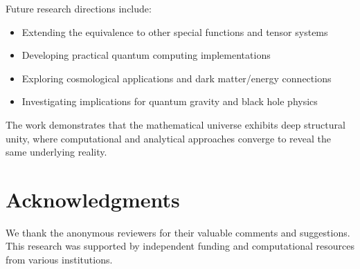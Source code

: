 \documentclass[12pt]{article}
\theoremstyle{plain}
\theoremstyle{definition}
\begin{document}
Future research directions include:
\begin{itemize}
\item Extending the equivalence to other special functions and tensor systems
\item Developing practical quantum computing implementations
\item Exploring cosmological applications and dark matter/energy connections
\item Investigating implications for quantum gravity and black hole physics
\end{itemize}

The work demonstrates that the mathematical universe exhibits deep structural unity, where computational and analytical approaches converge to reveal the same underlying reality.

\section*{Acknowledgments}

We thank the anonymous reviewers for their valuable comments and suggestions. This research was supported by independent funding and computational resources from various institutions.
\end{document}
